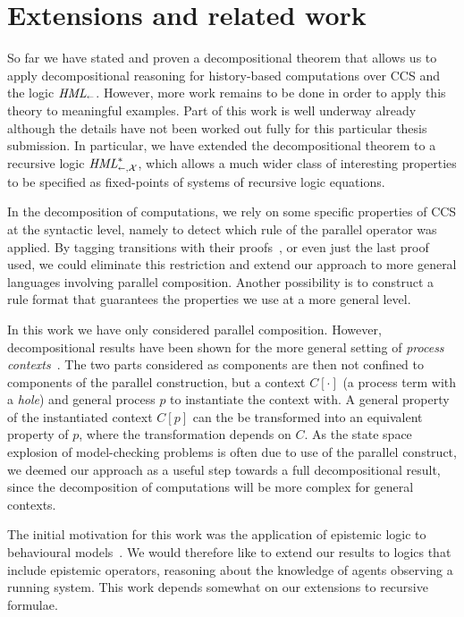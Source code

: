 \section{Extensions and related work} %
\label{sec:decomp_future}

So far we have stated and proven a decompositional theorem that allows us to
apply decompositional reasoning for history-based computations over CCS and
the logic $\textit{HML}_\shortleftarrow$. However, more work remains to be done in order to apply
this theory to meaningful examples. Part of this work is well underway already
although the details have not been worked out fully for this particular thesis
submission. In particular, we have extended the decompositional theorem to a
recursive logic $\textit{HML}_{\shortleftarrow,\mathcal{X}}^*$, which allows a much wider class of interesting 
properties to be specified as fixed-points of systems of recursive logic equations.

In the decomposition of computations, we rely on some specific properties of 
CCS at the syntactic level, namely to detect which rule of the parallel operator
was applied. By tagging transitions with their proofs~\cite{BC88,DeganoP92}, 
or even just the last
proof used, we could eliminate this restriction and extend our approach to more
general languages involving parallel composition. Another possibility is to construct
a rule format that guarantees the properties we use at a more general level.

In this work we have only considered parallel composition. However, decompositional
results have been shown for the more general setting of \emph{process contexts}~\cite{Larsen91}.
The two parts considered as components are then not confined to components
of the parallel construction, but a context $C[\cdot]$ (a process term with a \emph{hole})
and general process $p$ to instantiate the context with. A general property of the
instantiated context $C[p]$ can the be transformed into an equivalent property
of $p$, where the transformation depends on $C$. As the state space explosion
of model-checking problems is often due to use of the parallel construct, we
deemed our approach as a useful step towards a full decompositional result, since
the decomposition of computations will be more complex for general contexts.

The initial motivation for this work was the application of epistemic logic
to behavioural models~\cite{Mousavi07-LPAR}. We would therefore like to extend
our results to logics that include epistemic operators, reasoning about the knowledge
of agents observing a running system. This work depends somewhat on our extensions
to recursive formulae.

